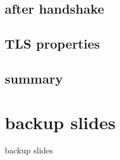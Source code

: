 \subsection{after handshake}


\subsection{TLS properties}

\subsection{summary}




\usetikzlibrary{circuits.logic.mux}







\section{backup slides}
\begin{frame}{backup slides}
\end{frame}



